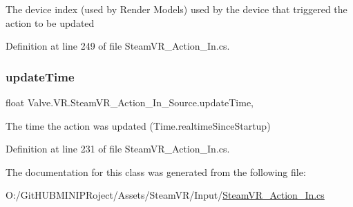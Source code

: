 The device index (used by Render Models) used by the device that triggered the action to be updated 



Definition at line 249 of file Steam\+V\+R\+\_\+\+Action\+\_\+\+In.\+cs.

\mbox{\label{class_valve_1_1_v_r_1_1_steam_v_r___action___in___source_a2d300fd44241f60b98cd73088d120c24}} 
\subsubsection{\texorpdfstring{updateTime}{updateTime}}
{\footnotesize\ttfamily float Valve.\+V\+R.\+Steam\+V\+R\+\_\+\+Action\+\_\+\+In\+\_\+\+Source.\+update\+Time\hspace{0.3cm}{\ttfamily [get]}, {}}



The time the action was updated (Time.\+realtime\+Since\+Startup) 



Definition at line 231 of file Steam\+V\+R\+\_\+\+Action\+\_\+\+In.\+cs.



The documentation for this class was generated from the following file\+:\begin{DoxyCompactItemize}
\item 
O\+:/\+Git\+H\+U\+B\+M\+I\+N\+I\+P\+Roject/\+Assets/\+Steam\+V\+R/\+Input/\mbox{\hyperlink{_steam_v_r___action___in_8cs}{Steam\+V\+R\+\_\+\+Action\+\_\+\+In.\+cs}}\end{DoxyCompactItemize}
